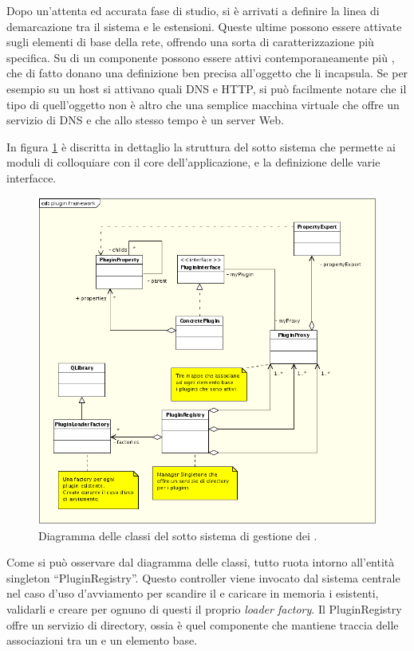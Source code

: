 Dopo un'attenta ed accurata fase di studio, si è arrivati a definire la linea di demarcazione tra il sistema e le estensioni. Queste ultime possono essere attivate sugli elementi di base della rete, offrendo una sorta di caratterizzazione più specifica. Su di un componente possono essere attivi contemporaneamente più \plugin{}, che di fatto donano una definizione ben precisa all'oggetto che li incapsula.
Se per esempio su un host si attivano \plugin{} quali DNS e HTTP, si può facilmente notare che il tipo di quell'oggetto non è altro che una semplice macchina virtuale che offre un servizio di DNS e che allo stesso tempo è un server Web.

In figura \ref{figura:uml_plugin_framework} è discritta in dettaglio la struttura del sotto sistema che permette ai moduli di colloquiare con il core dell'applicazione, e la definizione delle varie interfacce.
\begin{figure}[!htb]
	\centering
	\includegraphics[width=12cm]{images/plugin_framework_uml.png}
	\caption{Diagramma delle classi del sotto sistema di gestione dei \plugin{}.}
	\label{figura:uml_plugin_framework}
\end{figure}
Come si può osservare dal diagramma delle classi, tutto ruota intorno all'entità singleton ``PluginRegistry''. Questo controller viene invocato dal sistema centrale nel caso d'uso d'avviamento per scandire il \fs{} e caricare in memoria i \plugin{} esistenti, validarli e creare per ognuno di questi il proprio \emph{loader factory}. Il PluginRegistry offre un servizio di directory, ossia è quel componente che mantiene traccia delle associazioni tra un \plugin{} e un elemento base.

